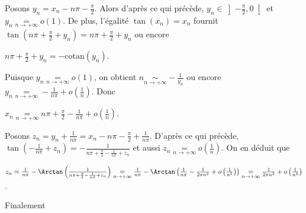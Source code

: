 {{Posons $y_n = x_n-n\pi- \frac{\pi}{2}$. Alors d'après ce qui précède, $y_n\in\left]- \frac{\pi}{2},0\right[$ et $y_n\underset{n\rightarrow+\infty}{=} o(1)$. De plus, l'égalité $\tan(x_n)=x_n$ fournit $\tan(n\pi+ \frac{\pi}{2}+y_n) =n\pi+ \frac{\pi}{2}+y_n$ ou encore 

\begin{center}
$n\pi+ \frac{\pi}{2}+y_n = -\mathrm{cotan}(y_n)$.
\end{center}

Puisque $y_n\underset{n\rightarrow+\infty}{=}o(1)$, on obtient $n\underset{n\rightarrow+\infty}{\sim}- \frac{1}{y_n}$  ou encore $y_n\underset{n\rightarrow+\infty}{=} - \frac{1}{n\pi}+o\left( \frac{1}{n}\right)$. Donc

\begin{center}
$x_n\underset{n\rightarrow+\infty}{=} n\pi+ \frac{\pi}{2}- \frac{1}{n\pi}+o\left( \frac{1}{n}\right)$.
\end{center}

Posons $z_n = y_n+ \frac{1}{n\pi}= x_n-n\pi- \frac{\pi}{2}+ \frac{1}{n\pi}$. D'après ce qui précède, $\tan\left(- \frac{1}{n\pi}+z_n\right)=- \frac{1}{n\pi+ \frac{\pi}{2}- \frac{1}{n\pi}+z_n}$ et aussi $z_n\underset{n\rightarrow+\infty}{=}o\left( \frac{1}{n}\right)$. On en déduit que

\begin{center}
$z_n= \frac{1}{n\pi}-\Arctan\left( \frac{1}{n\pi+ \frac{\pi}{2}- \frac{1}{n\pi}+z_n}\right)\underset{n\rightarrow+\infty}{=} \frac{1}{n\pi}-\Arctan\left( \frac{1}{n\pi}- \frac{1}{2\pi n^2}+o\left( \frac{1}{n^2}\right)\right)\underset{n\rightarrow+\infty}{=} \frac{1}{2\pi n^2}+o\left( \frac{1}{n^2}\right)$.
\end{center}

Finalement

\begin{center}
\end{center}
}
}
